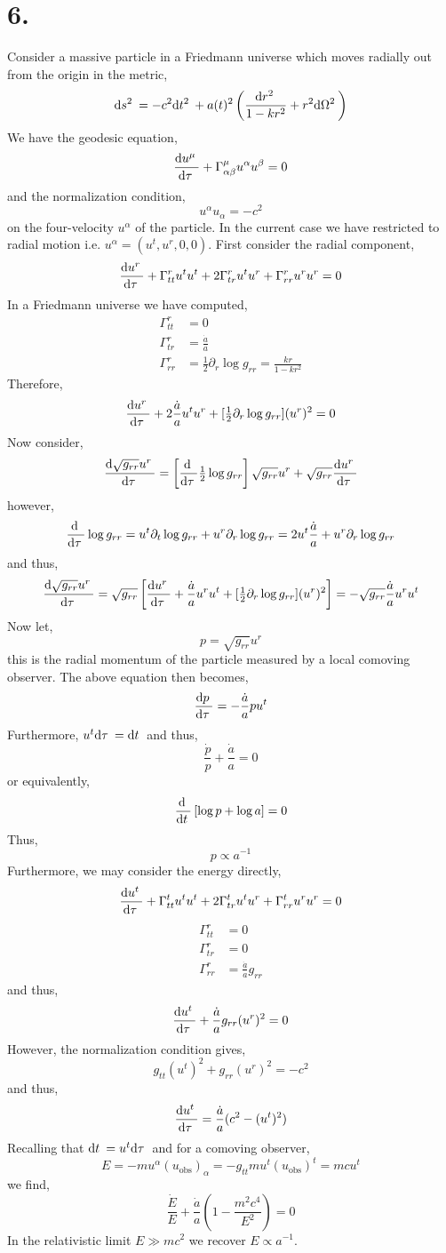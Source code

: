 \documentclass[12pt]{article}
\begin{document}
\section*{6.}

Consider a massive particle in a Friedmann universe which moves radially out from the origin in the metric,
\[ \mathrm{d}s^2 \: = - c^2 \mathrm{d}t^2 \: + a(t)^2 \left( \frac{\mathrm{d}r^2 \:}{1 - k r^2} + r^2 \mathrm{d}\Omega^2 \: \right) \]
We have the geodesic equation,
\[ \frac{\mathrm{d}u^\mu \:}{\mathrm{d}\tau \:} + \Gamma^\mu_{\alpha \beta} u^\alpha u^\beta = 0 \]
and the normalization condition,
\[ u^\alpha u_\alpha = - c^2 \]
on the four-velocity $u^\alpha$ of the particle. In the current case we have restricted to radial motion i.e. $u^\alpha = (u^t, u^r, 0, 0)$. First consider the radial component,
\[ \frac{\mathrm{d}u^r \:}{\mathrm{d}\tau \:} + \Gamma^r_{tt} u^t u^t + 2\Gamma^r_{tr} u^t u^r + \Gamma^r_{rr} u^r u^r = 0 \]
In a Friedmann universe we have computed,
\begin{align*}
\Gamma^r_{tt} & = 0
\\
\Gamma^r_{tr} & = \frac{\dot{a}}{a}
\\
\Gamma^r_{rr} & = \tfrac{1}{2} \partial_r \log{g_{rr}} = \frac{k r}{1 - kr^2} 
\end{align*}
Therefore,
\[ \frac{\mathrm{d}u^r \:}{\mathrm{d}\tau \:} + 2 \frac{\dot{a}}{a} u^t u^r + [ \tfrac{1}{2} \partial_r \log{g_{rr}} ] (u^r)^2 = 0 \]
Now consider,
\[ \frac{\mathrm{d}\sqrt{g_{rr}} u^r \:}{\mathrm{d}\tau \:} = \left[ \frac{\mathrm{d} \:}{\mathrm{d}\tau \:} \tfrac{1}{2} \log{g_{rr}} \right] \sqrt{g_{rr}} u^r + \sqrt{g_{rr}} \frac{\mathrm{d}u^r \:}{\mathrm{d}\tau \:} \]
however,
\[ \frac{\mathrm{d} \:}{\mathrm{d}\tau \:} \log{g_{rr}} = u^t \partial_t \log{g_{rr}} + u^r \partial_r \log{g_{rr}} = 2 u^t \frac{\dot{a}}{a} + u^r \partial_r \log{g_{rr}} \] 
and thus,
\[ \frac{\mathrm{d}\sqrt{g_{rr}} u^r \:}{\mathrm{d}\tau \:} = \sqrt{g_{rr}} \left[ \frac{\mathrm{d}u^r \:}{\mathrm{d}\tau \:} +  \frac{\dot{a}}{a} u^r u^t + [\tfrac{1}{2} \partial_r \log{g_{rr}} ] (u^r)^2 \right] = - \sqrt{g_{rr}} \frac{\dot{a}}{a} u^r u^t \]
Now let,
\[ p = \sqrt{g_{rr}} u^r \]
this is the radial momentum of the particle measured by a local comoving observer. The above equation then becomes,
\[ \frac{\mathrm{d}p \:}{\mathrm{d}\tau \:} = - \frac{\dot{a}}{a} p u^t \]
Furthermore, $u^t \mathrm{d}\tau \: = \mathrm{d}t \:$ and thus,
\[ \frac{\dot{p}}{p} + \frac{\dot{a}}{a} = 0 \]
or equivalently,
\[ \frac{\mathrm{d} \:}{\mathrm{d}t \:} \left[ \log{p} + \log{a} \right] = 0 \]
Thus,
\[ p \propto a^{-1} \]  
Furthermore, we may consider the energy directly, 
\[ \frac{\mathrm{d}u^t \:}{\mathrm{d}\tau \:} + \Gamma^t_{tt} u^t u^t + 2\Gamma^t_{tr} u^t u^r + \Gamma^t_{rr} u^r u^r = 0 \]
\begin{align*}
\Gamma^r_{tt} & = 0
\\
\Gamma^r_{tr} & = 0
\\
\Gamma^r_{rr} & = \frac{\dot{a}}{a} g_{rr} 
\end{align*}
and thus,
\[ \frac{\mathrm{d}u^t \:}{\mathrm{d}\tau \:} + \frac{\dot{a}}{a} g_{rr} (u^r)^2 = 0 \]
However, the normalization condition gives,
\[ g_{tt} (u^t)^2 + g_{rr} (u^r)^2 = -c^2 \]
and thus,
\[ \frac{\mathrm{d}u^t \:}{\mathrm{d}\tau \:} = \frac{\dot{a}}{a} (c^2 - (u^t)^2) \]
Recalling that $\mathrm{d}t \: = u^t \mathrm{d}\tau \:$ and for a comoving observer,
\[ E = - m u^\alpha (u_{\text{obs}})_\alpha = - g_{tt} m u^t (u_{\text{obs}})^t = m c u^t \]
we find,
\[ \frac{\dot{E}}{E} + \frac{\dot{a}}{a} \left( 1 - \frac{m^2 c^4}{E^2} \right) = 0 \]
In the relativistic limit $E \gg m c^2$ we recover $E \propto a^{-1}$.
\end{document}
